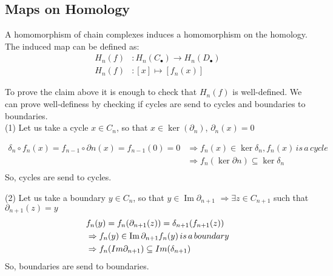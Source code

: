 \documentclass[11pt,a4paper]{report}
\DeclareMathOperator{\Ima}{Im}
\begin{document}
    
    
    \subsection{Maps on Homology}
     
            
                A homomorphism of chain complexes induces a homomorphism on the homology.
                The induced map can be defined as:
               \begin{align*}
                  H_n(f) &:  H_n(C_\bullet) \rightarrow H_n(D_\bullet)  \\
                  H_n(f) &: [x] \mapsto [f_n(x)]
                \end{align*}

                To prove the claim above it is enough to check that $H_n(f)$ is well-defined.
                We can prove well-definess by checking if cycles are send to cycles and boundaries to boundaries. \\
                
                (1) Let us take a cycle $x \in C_n$, so that $x \in \ker (\partial_n)$, $\partial_n(x) = 0$

                    \begin{align*}
                        \delta_n \circ f_n(x) = f_{n-1} \circ \partial n(x) = f_{n-1}(0) = 0 
                        &\Rightarrow f_n(x) \in \ker \delta_n , f_n(x) \, is \, a \, cycle \\
                        &\Rightarrow f_n(\ker \partial n) \subseteq \ker \delta_n \\
                    \end{align*}
                So, cycles are send to cycles.

                (2) Let us take a boundary $y \in C_n$, so that $y \in \Ima\partial_{n+1}$ 
                $\Rightarrow \exists z \in C_{n+1}$ such that $\partial_{n+1}(z) = y$ 
                \begin{align*}
                  &\null f_n(y) = f_n(\partial_{n+1}(z))  = \delta_{n+1}(f_{n+1}(z)) \\
                  &\null \Rightarrow f_n(y) \in \Ima\partial_{n+1} f_n(y) \, is \, a \, boundary\\
                  &\null \Rightarrow f_n(Im\partial_{n+1}) \subseteq Im(\delta_{n+1})
                \end{align*}
                So, boundaries are send to boundaries.
\end{document}
